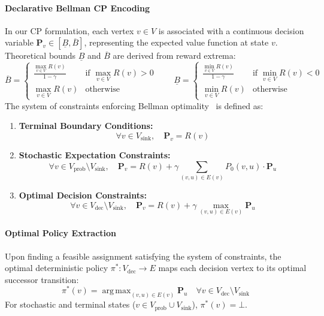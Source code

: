 \documentclass{article}
\begin{document}
\paragraph{Declarative Bellman CP Encoding}
In our CP formulation, each vertex $v \in V$ is associated with a continuous decision variable $\mathbf{P}_v \in [\underline{B}, \overline{B}]$, representing the expected value function at state $v$. Theoretical bounds $\underline{B}$ and $\overline{B}$ are derived from reward extrema:
\begin{equation}
\overline{B} = 
\begin{cases} 
\frac{\max_{v \in V} R(v)}{1 - \gamma} & \text{if } \max_{v \in V} R(v) > 0 \\ 
\max_{v \in V} R(v) & \text{otherwise} 
\end{cases}
\qquad
\underline{B} = 
\begin{cases} 
\frac{\min_{v \in V} R(v)}{1 - \gamma} & \text{if } \min_{v \in V} R(v) < 0 \\ 
\min_{v \in V} R(v) & \text{otherwise} 
\end{cases}
\end{equation}
The system of constraints enforcing Bellman optimality~\cite{Bellman:1957:dynamic,Puterman:1994Markov} is defined as:
\begin{enumerate}
    \item \textbf{Terminal Boundary Conditions:}
    \begin{equation}
    \forall v \in V_{\text{sink}}, \quad \mathbf{P}_v = R(v)
    \end{equation}
    
    \item \textbf{Stochastic Expectation Constraints:}
    \begin{equation}
    \forall v \in V_{\text{prob}} \setminus V_{\text{sink}}, \quad \mathbf{P}_v = R(v) + \gamma \sum_{(v, u) \in E(v)} P_0(v, u) \cdot \mathbf{P}_u
    \end{equation}
    
    \item \textbf{Optimal Decision Constraints:}
    \begin{equation}
    \forall v \in V_{\text{dec}} \setminus V_{\text{sink}}, \quad \mathbf{P}_v = R(v) + \gamma \max_{(v, u) \in E(v)} \mathbf{P}_u
    \end{equation}
\end{enumerate}

\paragraph{Optimal Policy Extraction}
Upon finding a feasible assignment satisfying the system of constraints, the optimal deterministic policy $\pi^* : V_{\text{dec}} \to E$ maps each decision vertex to its optimal successor transition:
\begin{equation}
\pi^*(v) = \operatorname{arg\,max}_{(v, u) \in E(v)} \mathbf{P}_u \quad \forall v \in V_{\text{dec}} \setminus V_{\text{sink}}
\end{equation}
For stochastic and terminal states ($v \in V_{\text{prob}} \cup V_{\text{sink}}$), $\pi^*(v) = \bot$.
\end{document}
